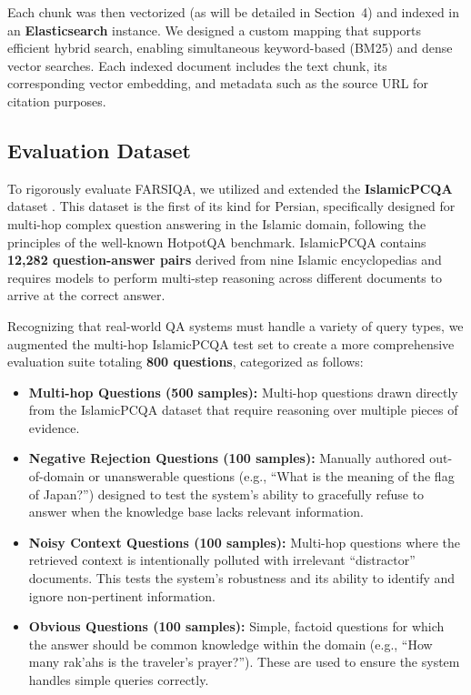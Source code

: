 \documentclass[11pt]{article}
\begin{document}
Each chunk was then vectorized (as will be detailed in Section~4) and indexed in an \textbf{Elasticsearch} instance. We designed a custom mapping that supports efficient hybrid search, enabling simultaneous keyword-based (BM25) \cite{robertson2009probabilistic} and dense vector searches. Each indexed document includes the text chunk, its corresponding vector embedding, and metadata such as the source URL for citation purposes.

\subsection{Evaluation Dataset}

To rigorously evaluate FARSIQA, we utilized and extended the \textbf{IslamicPCQA} dataset \cite{11075543}. This dataset is the first of its kind for Persian, specifically designed for multi-hop complex question answering in the Islamic domain, following the principles of the well-known HotpotQA benchmark. IslamicPCQA contains \textbf{12,282 question-answer pairs} derived from nine Islamic encyclopedias and requires models to perform multi-step reasoning across different documents to arrive at the correct answer.

Recognizing that real-world QA systems must handle a variety of query types, we augmented the multi-hop IslamicPCQA test set to create a more comprehensive evaluation suite totaling \textbf{800 questions}, categorized as follows:

\begin{itemize}
    \item \textbf{Multi-hop Questions (500 samples):} Multi-hop questions drawn directly from the IslamicPCQA dataset that require reasoning over multiple pieces of evidence.
    \item \textbf{Negative Rejection Questions (100 samples):} Manually authored out-of-domain or unanswerable questions (e.g., ``What is the meaning of the flag of Japan?'') designed to test the system's ability to gracefully refuse to answer when the knowledge base lacks relevant information.
    \item \textbf{Noisy Context Questions (100 samples):} Multi-hop questions where the retrieved context is intentionally polluted with irrelevant ``distractor'' documents. This tests the system's robustness and its ability to identify and ignore non-pertinent information.
    \item \textbf{Obvious Questions (100 samples):} Simple, factoid questions for which the answer should be common knowledge within the domain (e.g., ``How many rak'ahs is the traveler's prayer?''). These are used to ensure the system handles simple queries correctly.
\end{itemize}
\end{document}
